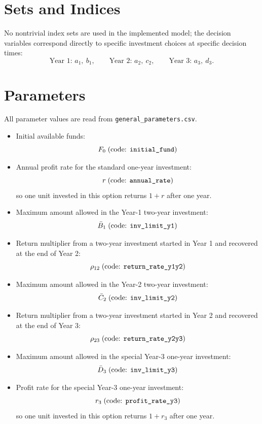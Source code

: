 \section*{Sets and Indices}

No nontrivial index sets are used in the implemented model; the decision variables correspond directly to specific investment choices at specific decision times:
\[
\text{Year 1: } a_1,\ b_1,\qquad
\text{Year 2: } a_2,\ c_2,\qquad
\text{Year 3: } a_3,\ d_3.
\]

\section*{Parameters}

All parameter values are read from \texttt{general\_parameters.csv}.

\begin{itemize}
    \item Initial available funds:
    \[
    F_0 \;(\text{code: \texttt{initial\_fund}})
    \]
    \item Annual profit rate for the standard one-year investment:
    \[
    r \;(\text{code: \texttt{annual\_rate}})
    \]
    so one unit invested in this option returns \(1+r\) after one year.
    \item Maximum amount allowed in the Year-1 two-year investment:
    \[
    \bar B_1 \;(\text{code: \texttt{inv\_limit\_y1}})
    \]
    \item Return multiplier from a two-year investment started in Year 1 and recovered at the end of Year 2:
    \[
    \rho_{12} \;(\text{code: \texttt{return\_rate\_y1y2}})
    \]
    \item Maximum amount allowed in the Year-2 two-year investment:
    \[
    \bar C_2 \;(\text{code: \texttt{inv\_limit\_y2}})
    \]
    \item Return multiplier from a two-year investment started in Year 2 and recovered at the end of Year 3:
    \[
    \rho_{23} \;(\text{code: \texttt{return\_rate\_y2y3}})
    \]
    \item Maximum amount allowed in the special Year-3 one-year investment:
    \[
    \bar D_3 \;(\text{code: \texttt{inv\_limit\_y3}})
    \]
    \item Profit rate for the special Year-3 one-year investment:
    \[
    r_3 \;(\text{code: \texttt{profit\_rate\_y3}})
    \]
    so one unit invested in this option returns \(1+r_3\) after one year.
\end{itemize}

